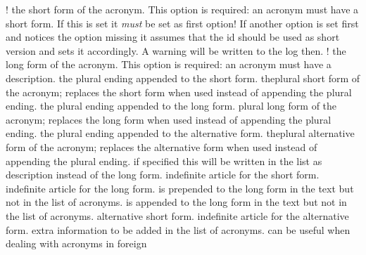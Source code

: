 \documentclass[load-preamble+]{cnltx-doc}
\begin{document}
\begin{options}
  \Default!
    the short form of the acronym.  This option is required: an acronym must
    have a short form.  If this is set it \emph{must} be set as first option!
    If another option is set first and notices the  option
    missing it assumes that the \acs{id} should be used as short version and
    sets it accordingly.  A warning will be written to the log then.
  \Default!
    the long form of the acronym.  This option is required: an acronym must
    have a description.
    the plural ending appended to the short form.
    theplural short form of the acronym; replaces the short
    form when used instead of appending the plural ending.
    the plural ending appended to the long form.
    plural long form of the acronym; replaces the long form when used
    instead of appending the plural ending.
    the plural ending appended to the alternative form.
    theplural alternative form of the acronym; replaces the
    alternative form when used instead of appending the plural ending.
    if specified this will be written in the list as
    description instead of the long form.
    indefinite article for the short form.
    indefinite article for the long form.
     is prepended to the long form in the text
    but not in the list of acronyms.
     is appended to the long form in the text but
    not in the list of acronyms.
    alternative short form.
    indefinite article for the alternative form.
    extra information to be added in the list of acronyms.
    can be useful when dealing with acronyms in foreign

\end{options}
\end{document}
